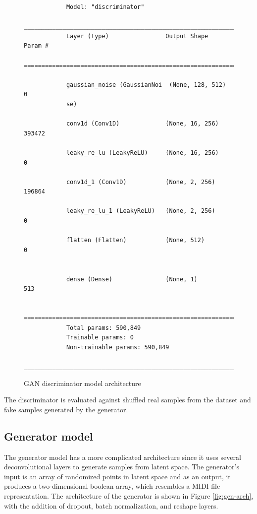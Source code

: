 \documentclass[a4paper, 11pt, twoside]{report}
\theoremstyle{definition}
\begin{document}
\begin{figure}
    \centering
    \begin{tiny}
        \begin{BVerbatim}
            Model: "discriminator"
            _________________________________________________________________
            Layer (type)                Output Shape              Param #
            =================================================================

            gaussian_noise (GaussianNoi  (None, 128, 512)         0
            se)

            conv1d (Conv1D)             (None, 16, 256)           393472

            leaky_re_lu (LeakyReLU)     (None, 16, 256)           0

            conv1d_1 (Conv1D)           (None, 2, 256)            196864

            leaky_re_lu_1 (LeakyReLU)   (None, 2, 256)            0

            flatten (Flatten)           (None, 512)               0


            dense (Dense)               (None, 1)                 513

            =================================================================
            Total params: 590,849
            Trainable params: 0
            Non-trainable params: 590,849
            _________________________________________________________________
        \end{BVerbatim}
    \end{tiny}
    \caption{GAN discriminator model architecture}
    \label{fig:disc-arch}
\end{figure}

The discriminator is evaluated against shuffled real samples from the dataset and fake samples generated by the generator. \par

\subsection{Generator model}

The generator model has a more complicated architecture since it uses several deconvolutional layers to generate samples from latent space. The generator's input is an array of randomized points in latent space and as an output, it produces a two-dimensional boolean array, which resembles a MIDI file representation. The architecture of the generator is shown in Figure \ref{fig:gen-arch}, with the addition of dropout, batch normalization, and reshape layers. \par
\end{document}
